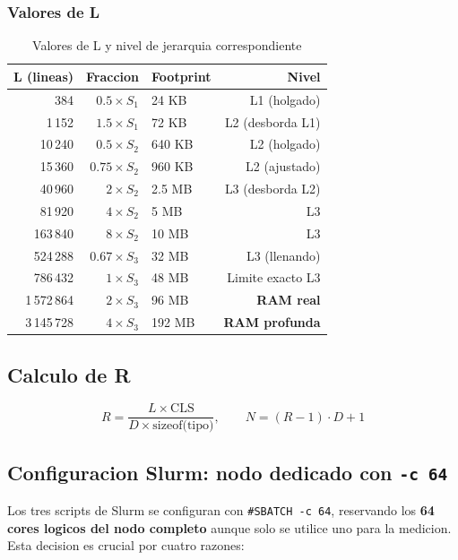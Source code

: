 \documentclass[12pt,a4paper]{article}
\begin{document}
\subsubsection*{Valores de L}

\begin{table}[H]
\centering
\caption{Valores de L y nivel de jerarquia correspondiente}
\label{tab:valoresL}
\begin{tabular}{rrlr}
\toprule
\textbf{L (lineas)} & \textbf{Fraccion} & \textbf{Footprint} & \textbf{Nivel} \\
\midrule
384         & $0.5 \times S_1$    & 24 KB   & L1 (holgado) \\
1\,152      & $1.5 \times S_1$    & 72 KB   & L2 (desborda L1) \\
10\,240     & $0.5 \times S_2$    & 640 KB  & L2 (holgado) \\
15\,360     & $0.75 \times S_2$   & 960 KB  & L2 (ajustado) \\
40\,960     & $2 \times S_2$      & 2.5 MB  & L3 (desborda L2) \\
81\,920     & $4 \times S_2$      & 5 MB    & L3 \\
163\,840    & $8 \times S_2$      & 10 MB   & L3 \\
524\,288    & $0.67 \times S_3$   & 32 MB   & L3 (llenando) \\
786\,432    & $1 \times S_3$      & 48 MB   & Limite exacto L3 \\
1\,572\,864 & $2 \times S_3$      & 96 MB   & \textbf{RAM real} \\
3\,145\,728 & $4 \times S_3$      & 192 MB  & \textbf{RAM profunda} \\
\bottomrule
\end{tabular}
\end{table}

\subsection{Calculo de R}

\[
  R = \frac{L \times \text{CLS}}{D \times \text{sizeof(tipo)}}, \qquad N = (R-1) \cdot D + 1
\]

\subsection{Configuracion Slurm: nodo dedicado con \texttt{-c 64}}

Los tres scripts de Slurm se configuran con \texttt{\#SBATCH -c 64}, reservando los \textbf{64 cores logicos del nodo completo} aunque solo se utilice uno para la medicion. Esta decision es crucial por cuatro razones:
\end{document}
